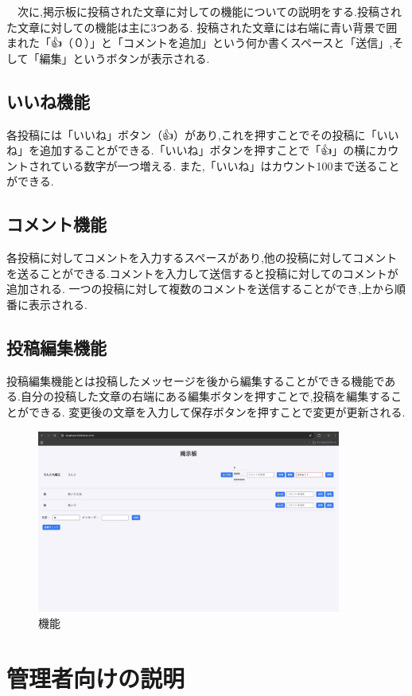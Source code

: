 \documentclass{jsarticle}
\begin{document}
　次に,掲示板に投稿された文章に対しての機能についての説明をする.投稿された文章に対しての機能は主に3つある.
投稿された文章には右端に青い背景で囲まれた「👍（０）」と「コメントを追加」という何か書くスペースと「送信」,そして「編集」というボタンが表示される.

\subsection{いいね機能}
各投稿には「いいね」ボタン（👍）があり,これを押すことでその投稿に「いいね」を追加することができる.「いいね」ボタンを押すことで「👍」の横にカウントされている数字が一つ増える.
また,「いいね」はカウント100まで送ることができる.

\subsection{コメント機能}
各投稿に対してコメントを入力するスペースがあり,他の投稿に対してコメントを送ることができる.コメントを入力して送信すると投稿に対してのコメントが追加される.
一つの投稿に対して複数のコメントを送信することができ,上から順番に表示される.


\subsection{投稿編集機能}
投稿編集機能とは投稿したメッセージを後から編集することができる機能である.自分の投稿した文章の右端にある編集ボタンを押すことで,投稿を編集することができる.
変更後の文章を入力して保存ボタンを押すことで変更が更新される.

\begin{figure}[H]
    \centering
    \includegraphics[width=10cm]{fig/kinou.jpeg}
    \caption{機能}
    \label{photoreflector_characteristic}
\end{figure}

\section{管理者向けの説明}
\end{document}
